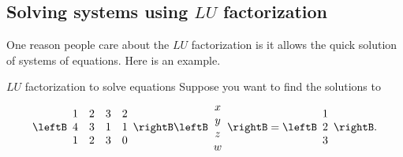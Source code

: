 \subsection{Solving systems using $LU$ factorization}

One reason people care about the $LU$ factorization
 is it allows the quick solution of
systems of equations. Here is an example.

\begin{example}{$LU$ factorization to solve equations}{}
Suppose you want to find the solutions to
\begin{equation*}
\leftB
\begin{array}{rrrr}
1 & 2 & 3 & 2 \\
4 & 3 & 1 & 1 \\
1 & 2 & 3 & 0
\end{array}
\rightB \leftB
\begin{array}{c}
x \\
y \\
z \\
w
\end{array}
\rightB =\leftB
\begin{array}{c}
1 \\
2 \\
3
\end{array}
\rightB .
\end{equation*}
\end{example}

